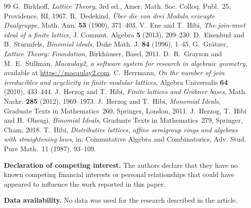 \documentclass{amsart}
\theoremstyle{definition}
\begin{document}
\begin{thebibliography}{99}
 G.~Birkhoff, \emph{Lattice Theory}, 3rd ed., Amer. Math. Soc. Colloq. Publ.~25, Providence, RI, 1967.
 R.~Dedekind, \emph{\"Uber die von drei Moduln erzeugte Dualgruppe}, Math. Ann. \textbf{53} (1900), 371--403.
 V.~Ene and T.~Hibi, \emph{The join-meet ideal of a finite lattice}, J. Commut. Algebra \textbf{5} (2013), 209--230.
 D.~Eisenbud and B.~Sturmfels, \emph{Binomial ideals}, Duke Math. J. \textbf{84} (1996), 1--45.
 G.~Gr\"atzer, \emph{Lattice Theory: Foundation}, Birkh\"auser, Basel, 2011.
 D.~R.~Grayson and M.~E.~Stillman, \emph{Macaulay2, a software system for research in algebraic geometry}, available at \url{https://macaulay2.com}.
 C.~Herrmann, \emph{On the number of join irreducibles and acyclicity in finite modular lattices}, Algebra Universalis \textbf{64} (2010), 433--444.
 J.~Herzog and T.~Hibi, \emph{Finite lattices and Gr\"obner bases}, Math. Nachr. \textbf{285} (2012), 1969--1973.
 J.~Herzog and T.~Hibi, \emph{Monomial Ideals}, Graduate Texts in Mathematics~260, Springer, London, 2011.
 J.~Herzog, T.~Hibi and H.~Ohsugi, \emph{Binomial Ideals}, Graduate Texts in Mathematics~279, Springer, Cham, 2018.
 T.~Hibi, \emph{Distributive lattices, affine semigroup rings and algebras with straightening laws}, in: Commutative Algebra and Combinatorics, Adv. Stud. Pure Math.~11 (1987), 93--109.
\end{thebibliography}

\bigskip

\begin{footnotesize}
	
	{\bf Declaration of competing interest.}  The authors declare that they have no known competing financial interests or personal relationships that could have appeared to influence the work reported in this paper.
	
	\medskip
	
	{\bf Data availability.} No data was used for the research described in the article. 
	
\end{footnotesize}
\bigskip
\end{document}

